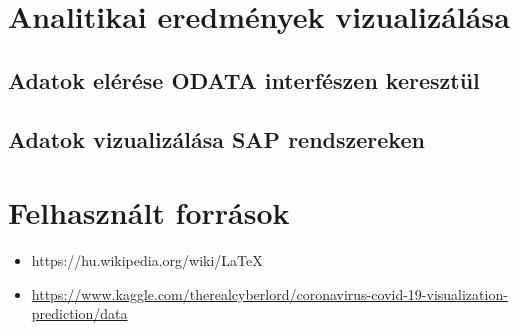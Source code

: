 \documentclass[12pt,a4papaer]{article}
\begin{document}
    \newpage
    \section{Analitikai eredmények vizualizálása}
    \subsection{Adatok elérése ODATA interfészen keresztül}
    \subsection{Adatok vizualizálása SAP rendszereken}

    \newpage
    \section{Felhasznált források}
    \begin{itemize}
        \item https://hu.wikipedia.org/wiki/LaTeX
        \item \label{dataset_link} \url{ https://www.kaggle.com/therealcyberlord/coronavirus-covid-19-visualization-prediction/data}
    \end{itemize}
\end{document}
